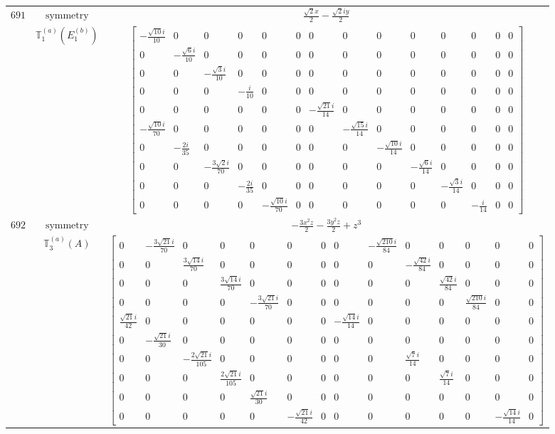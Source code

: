 \documentclass[fleqn,8pt,landscape]{jsarticle}
\begin{document}
\begin{longtable}{ccc}
$ 691 $ & $ \text{symmetry} $ & $ \frac{\sqrt{2} x}{2} - \frac{\sqrt{2} i y}{2} $ \\
$  $ & $ \mathbb{T}_{1}^{(a)}(E_{1}^{(b)}) $ & $ \begin{bmatrix} - \frac{\sqrt{10} i}{10} & 0 & 0 & 0 & 0 & 0 & 0 & 0 & 0 & 0 & 0 & 0 & 0 & 0 \\ 0 & - \frac{\sqrt{6} i}{10} & 0 & 0 & 0 & 0 & 0 & 0 & 0 & 0 & 0 & 0 & 0 & 0 \\ 0 & 0 & - \frac{\sqrt{3} i}{10} & 0 & 0 & 0 & 0 & 0 & 0 & 0 & 0 & 0 & 0 & 0 \\ 0 & 0 & 0 & - \frac{i}{10} & 0 & 0 & 0 & 0 & 0 & 0 & 0 & 0 & 0 & 0 \\ 0 & 0 & 0 & 0 & 0 & 0 & - \frac{\sqrt{21} i}{14} & 0 & 0 & 0 & 0 & 0 & 0 & 0 \\ - \frac{\sqrt{10} i}{70} & 0 & 0 & 0 & 0 & 0 & 0 & - \frac{\sqrt{15} i}{14} & 0 & 0 & 0 & 0 & 0 & 0 \\ 0 & - \frac{2 i}{35} & 0 & 0 & 0 & 0 & 0 & 0 & - \frac{\sqrt{10} i}{14} & 0 & 0 & 0 & 0 & 0 \\ 0 & 0 & - \frac{3 \sqrt{2} i}{70} & 0 & 0 & 0 & 0 & 0 & 0 & - \frac{\sqrt{6} i}{14} & 0 & 0 & 0 & 0 \\ 0 & 0 & 0 & - \frac{2 i}{35} & 0 & 0 & 0 & 0 & 0 & 0 & - \frac{\sqrt{3} i}{14} & 0 & 0 & 0 \\ 0 & 0 & 0 & 0 & - \frac{\sqrt{10} i}{70} & 0 & 0 & 0 & 0 & 0 & 0 & - \frac{i}{14} & 0 & 0 \end{bmatrix} $ \\ \hline
$ 692 $ & $ \text{symmetry} $ & $ - \frac{3 x^{2} z}{2} - \frac{3 y^{2} z}{2} + z^{3} $ \\
$  $ & $ \mathbb{T}_{3}^{(a)}(A) $ & $ \begin{bmatrix} 0 & - \frac{3 \sqrt{21} i}{70} & 0 & 0 & 0 & 0 & 0 & 0 & - \frac{\sqrt{210} i}{84} & 0 & 0 & 0 & 0 & 0 \\ 0 & 0 & \frac{3 \sqrt{14} i}{70} & 0 & 0 & 0 & 0 & 0 & 0 & - \frac{\sqrt{42} i}{84} & 0 & 0 & 0 & 0 \\ 0 & 0 & 0 & \frac{3 \sqrt{14} i}{70} & 0 & 0 & 0 & 0 & 0 & 0 & \frac{\sqrt{42} i}{84} & 0 & 0 & 0 \\ 0 & 0 & 0 & 0 & - \frac{3 \sqrt{21} i}{70} & 0 & 0 & 0 & 0 & 0 & 0 & \frac{\sqrt{210} i}{84} & 0 & 0 \\ \frac{\sqrt{21} i}{42} & 0 & 0 & 0 & 0 & 0 & 0 & - \frac{\sqrt{14} i}{14} & 0 & 0 & 0 & 0 & 0 & 0 \\ 0 & - \frac{\sqrt{21} i}{30} & 0 & 0 & 0 & 0 & 0 & 0 & 0 & 0 & 0 & 0 & 0 & 0 \\ 0 & 0 & - \frac{2 \sqrt{21} i}{105} & 0 & 0 & 0 & 0 & 0 & 0 & \frac{\sqrt{7} i}{14} & 0 & 0 & 0 & 0 \\ 0 & 0 & 0 & \frac{2 \sqrt{21} i}{105} & 0 & 0 & 0 & 0 & 0 & 0 & \frac{\sqrt{7} i}{14} & 0 & 0 & 0 \\ 0 & 0 & 0 & 0 & \frac{\sqrt{21} i}{30} & 0 & 0 & 0 & 0 & 0 & 0 & 0 & 0 & 0 \\ 0 & 0 & 0 & 0 & 0 & - \frac{\sqrt{21} i}{42} & 0 & 0 & 0 & 0 & 0 & 0 & - \frac{\sqrt{14} i}{14} & 0 \end{bmatrix} $ \\ \hline

\end{longtable}
\end{document}
